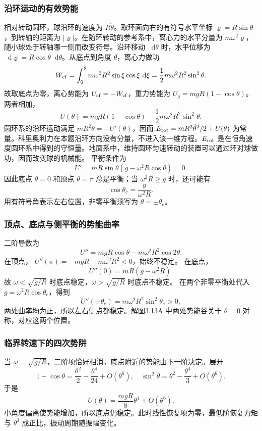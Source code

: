 \documentclass[UTF8,fontset=fandol,a4paper,11pt]{ctexart}
\newcommand{\dd}{\mathop{}\!\mathrm{d}}
\begin{document}
\subsubsection*{沿环运动的有效势能}
相对转动圆环，球沿环的速度为 $R\dot\theta$。取环面向右的有符号水平坐标 $\varrho=R\sin\theta$，到转轴的距离为 $|\varrho|$。在随环转动的参考系中，离心力的水平分量为 $m\omega^2\varrho$，随小球处于转轴哪一侧而改变符号。沿环移动 $\dd\theta$ 时，水平位移为 $\dd\varrho=R\cos\theta\dd\theta$。从底点到角度 $\theta$，离心力做功
\[
W_{\rm cf}=\int_0^\theta m\omega^2R^2\sin\xi\cos\xi\,\dd\xi
=\frac12m\omega^2R^2\sin^2\theta.
\]
故取底点为零，离心势能为 $U_{\rm cf}=-W_{\rm cf}$，重力势能为 $U_g=mgR(1-\cos\theta)$。两者相加，
\[
U(\theta)=mgR(1-\cos\theta)
-\frac12m\omega^2R^2\sin^2\theta.
\]
圆环系的沿环运动满足 $mR^2\ddot\theta=-U'(\theta)$，因而 $E_{\rm rot}=mR^2\dot\theta^2/2+U(\theta)$ 为常量。科里奥利力在本题沿环方向没有分量，不进入该一维方程。$E_{\rm rot}$ 是在恒角速度圆环系中得到的守恒量。地面系中，维持圆环匀速转动的装置可以通过环对球做功，因而改变球的机械能。
平衡条件为
\[
U'=mR\sin\theta(g-\omega^2R\cos\theta)=0.
\]
因此底点 $\theta=0$ 和顶点 $\theta=\pi$ 总是平衡；当 $\omega^2R\geq g$ 时，还可能有
\[
\cos\theta_e=\frac{g}{\omega^2R}.
\]
用有符号角表示左右位置，非零平衡须写为 $\theta=\pm\theta_e$。

\subsubsection*{顶点、底点与侧平衡的势能曲率}
二阶导数为
\[
U''=mgR\cos\theta-m\omega^2R^2\cos2\theta.
\]
在顶点，
$U''(\pi)=-mgR-m\omega^2R^2<0$，始终不稳定。
在底点，
\[
U''(0)=mR(g-\omega^2R).
\]
故 $\omega<\sqrt{g/R}$ 时底点稳定，$\omega>\sqrt{g/R}$ 时底点不稳定。
在两个非零平衡处代入 $g=\omega^2R\cos\theta_e$，得到
\[
U''(\pm\theta_e)=m\omega^2R^2\sin^2\theta_e>0,
\]
两处曲率均为正，所以左右侧点都稳定。解图3.13A 中两处势能谷关于 $\theta=0$ 对称，对应这两个位置。

\subsubsection*{临界转速下的四次势阱}
当 $\omega=\sqrt{g/R}$，二阶项恰好相消，底点附近的势能由下一阶决定。展开
\[
1-\cos\theta=\frac{\theta^2}{2}-\frac{\theta^4}{24}+O(\theta^6),
\quad
\sin^2\theta=\theta^2-\frac{\theta^4}{3}+O(\theta^6).
\]
于是
\[
U(\theta)=\frac{mgR}{8}\theta^4+O(\theta^6).
\]
小角度偏离使势能增加，所以底点仍稳定。此时线性恢复项为零，最低阶恢复力矩与 $\theta^3$ 成正比，振动周期随振幅变化。
\end{document}
